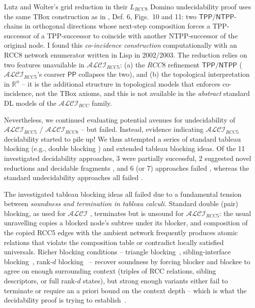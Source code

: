\documentclass[
]{ceurart}
\theoremstyle{definition}
\newcommand{\ALCI}{\ensuremath{\mathcal{ALCI}}}
\newcommand{\ALCIRCC}[1]{\ensuremath{\mathcal{ALCI}_{\mathit{RCC#1}}}}
\newcommand{\LRCC}[1]{\ensuremath{L_{\mathit{RCC#1}}}}
\newcommand{\PP}{\ensuremath{\mathsf{PP}}}
\newcommand{\TPP}{\ensuremath{\mathsf{TPP}}}
\newcommand{\NTPP}{\ensuremath{\mathsf{NTPP}}}
\begin{document}
Lutz and Wolter's grid reduction in their $\LRCC{8}$ Domino
undecidability proof uses the same TBox construction as in
\cite{Wessel2003}, Def. 6, Figs.\ 10 and 11: two $\TPP/\NTPP$-chains
in orthogonal directions whose next-step composition forces a
TPP-successor of a TPP-successor to coincide with another
NTPP-successor of the original node.  I found this \emph{co-incidence
construction} computationally with an RCC8 network enumerator written
in Lisp in 2002/2003. The reduction relies on two features unavailable
in \ALCIRCC{5}: (a) the $\mathit{RCC}8$ refinement $\TPP/\NTPP$
(\ALCIRCC{5}'s coarser $\PP$ collapses the two), and (b) the
topological interpretation in $\mathbb{R}^n$ -- it is the additional
structure in topological models that enforces co-incidence, not the
TBox axioms, and this is not available in the \emph{abstract} standard
DL models of the $\ALCIRCC{}$ family.

Nevertheless, we continued evaluating potential avenues for
undecidability of $\ALCIRCC{5}$ / $\ALCIRCC{8}$ -- but failed.
Instead, evidence indicating $\ALCIRCC{5}$ decidability started to
pile up! We thus attempted a series of standard tableau blocking
(e.g., double blocking \cite{DLHandbook2007}) and extended tableau
blocking ideas.  Of the 11 investigated decidability approaches, 3
were partially successful, 2 suggested novel reductions and decidable
fragments \cite{TwoTierQuotient}, and 6 (or 7) approaches failed
\cite{ALCIRCC5Outdated}, whereas the standard undecidability
approaches all failed \cite{ALCIRCC5Repo}.

The investigated tableau blocking ideas all failed due to a
fundamental tension between \emph{soundness and termination in tableau
calculi.} Standard double (pair) blocking, as used for \ALCI
\cite{DLHandbook2007}, terminates but is unsound for \ALCIRCC{5}: the
usual unravelling copies a blocked node's subtree under its blocker,
and composition of the copied RCC5 edges with the ambient network
frequently produces atomic relations that violate the composition
table or contradict locally satisfied universals.  Richer blocking
conditions -- triangle
blocking~\cite{TriangleBlocking,ResponseGPTBlocking},
sibling-interface blocking~\cite{SiblingCompleted}, rank-$d$
blocking~\cite{CompletenessExtraction} -- recover soundness by forcing
blocker and blockee to agree on enough surrounding context
(triples of RCC relations, sibling descriptors, or full rank-$d$
states), but strong enough variants either fail to terminate or
require an a priori bound on the context depth -- which is what the
decidability proof is trying to
establish~\cite{FWProof,PatchworkAugmentation,
  TypedPatchworkCounterexample,ALCIRCC5Outdated,StatusAfterFW}.
\end{document}
